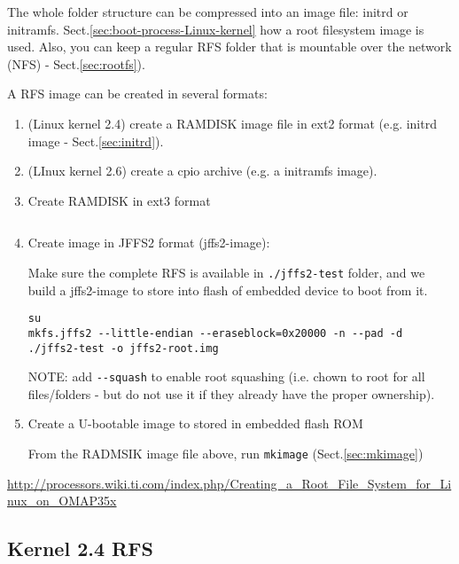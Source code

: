 The whole folder structure can be compressed into an image file:
initrd or initramfs. Sect.\ref{sec:boot-process-Linux-kernel} how a root
filesystem image is used. Also, you can keep a regular RFS
folder that is mountable over the network (NFS) - Sect.\ref{sec:rootfs}).
  
  
A RFS image can be created in several formats:
\begin{enumerate}
  \item (Linux kernel 2.4) create a RAMDISK image file in ext2 format (e.g.
  initrd  image - Sect.\ref{sec:initrd}).

  
  \item (LInux kernel 2.6) create a cpio archive (e.g. a initramfs image).
    
  \item Create RAMDISK in ext3 format
  
\begin{verbatim}

\end{verbatim}
  
  \item Create image in JFFS2 format (jffs2-image):
  
  Make sure the complete RFS is available in \verb!./jffs2-test! folder, and we
  build a jffs2-image  to store into flash of embedded device to boot from it.

\begin{verbatim}
su
mkfs.jffs2 --little-endian --eraseblock=0x20000 -n --pad -d ./jffs2-test -o jffs2-root.img
\end{verbatim}
NOTE: add \verb!--squash! to enable root squashing (i.e. chown to root for all
files/folders - but do not use it if they already have the proper ownership).
    
  \item Create a U-bootable image to stored in embedded flash ROM
  
From the RADMSIK image file above, run \verb!mkimage! (Sect.\ref{sec:mkimage})  
\end{enumerate} 
\url{http://processors.wiki.ti.com/index.php/Creating_a_Root_File_System_for_Linux_on_OMAP35x}



\subsection{Kernel 2.4 RFS}
\label{sec:RFS-Linux-kernel-2.4}

